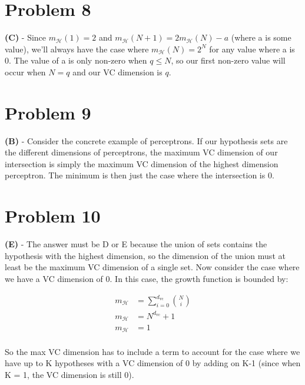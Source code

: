\documentclass[10pt,letter]{article}
\begin{document}
\section*{Problem 8}

\textbf{(C)} - Since $m_\mathcal{H}(1) = 2$ and $m_\mathcal{H}(N+1) = 2 m_\mathcal{H}(N) - a$ (where a is some value), we'll always have the case where $m_\mathcal{H}(N) = 2^N$ for any value where a is 0. The value of a is only non-zero when $q \leq N$, so our first non-zero value will occur when $N = q$ and our VC dimension is $q$.

\section*{Problem 9}

\textbf{(B)} - Consider the concrete example of perceptrons. If our hypothesis sets are the different dimensions of perceptrons, the maximum VC dimension of our intersection is simply the maximum VC dimension of the highest dimension perceptron. The minimum is then just the case where the intersection is 0.

\section*{Problem 10}

\textbf{(E)} - The answer must be D or E because the union of sets contains the hypothesis with the highest dimension, so the dimension of the union must at least be the maximum VC dimension of a single set. Now consider the case where we have a VC dimension of 0. In this case, the growth function is bounded by: 

\begin{align*}
m_\mathcal{H} & = \sum_{i=0}^{d_{\textrm{vc}}}\binom Ni \\
m_\mathcal{H} & = N^{d_{\textrm{vc}}} + 1 \\
m_\mathcal{H} & = 1 \\
\end{align*}

So the max VC dimension has to include a term to account for the case where we have up to K hypotheses with a VC dimension of 0 by adding on K-1 (since when K = 1, the VC dimension is still 0).
\end{document}
